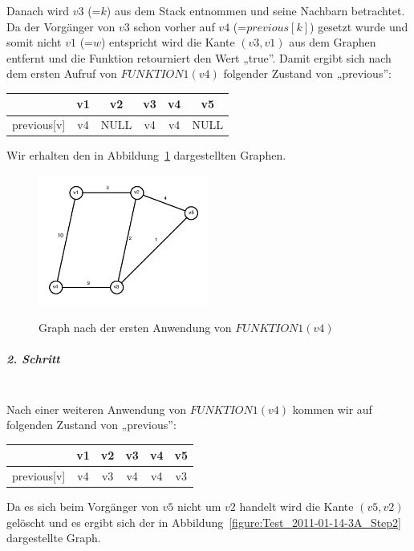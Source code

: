 \documentclass[a4paper, 12pt]{article}
\begin{document}
Danach wird $v3$ (=$k$) aus dem Stack entnommen und seine Nachbarn betrachtet. Da der Vorgänger von $v3$ schon vorher auf $v4$ (=$previous[k]$) gesetzt wurde und somit nicht $v1$ (=$w$) entspricht wird die Kante $(v3,v1)$ aus dem Graphen entfernt und die Funktion retourniert den Wert „true”. Damit ergibt sich nach dem ersten Aufruf von $FUNKTION1(v4)$ folgender Zustand von „previous”:

\begin{center}
	\begin{tabular}{lccccc}
					& v1	& v2	& v3 & v4	& v5\\
		\hline
		previous[v] & v4	& NULL	& v4 & v4	& NULL\\
	\end{tabular}
\end{center}

Wir erhalten den in Abbildung~\ref{figure:Test_2011-01-14-3A_Step1} dargestellten Graphen.

\begin{figure}[htbp]
	\caption{Graph nach der ersten Anwendung von $FUNKTION1(v4)$}
	\vskip 0.2cm
	\centering
	\includegraphics[width=0.5\textwidth]{Figures/Test_2011-01-14-3A_Step1}
	\label{figure:Test_2011-01-14-3A_Step1}
\end{figure}

\subparagraph{2. Schritt}~\\

Nach einer weiteren Anwendung von $FUNKTION1(v4)$ kommen wir auf folgenden Zustand von „previous”:

\begin{center}
	\begin{tabular}{lccccc}
					& v1	& v2	& v3 & v4	& v5\\
		\hline
		previous[v] & v4	& v3	& v4	& v4 & v3 \\
	\end{tabular}
\end{center}

Da es sich beim Vorgänger von $v5$ nicht um $v2$ handelt wird die Kante $(v5,v2)$ gelöscht und es ergibt sich der in Abbildung~\ref{figure:Test_2011-01-14-3A_Step2} dargestellte Graph.
\end{document}

